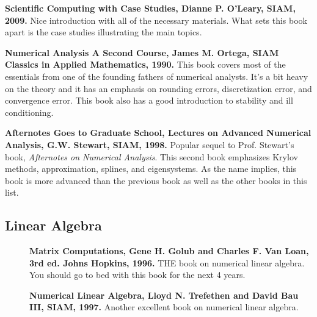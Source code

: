 \documentclass[11pt]{article}
\begin{document}
\begin{description}

\item {\bf Scientific Computing with Case Studies, Dianne P. O'Leary, SIAM, 2009.}  Nice introduction with all of the necessary materials.  What sets this book apart is the case studies illustrating the main topics.

\item {\bf Numerical Analysis A Second Course, James M. Ortega, SIAM Classics in Applied Mathematics, 1990.} This book covers most of the essentials from one of the founding fathers of numerical analysts.  It's a bit heavy on the theory and it has an emphasis on rounding errors, discretization error, and convergence error.  This book also has a good introduction to stability and ill conditioning.

 \item[] {\bf Afternotes Goes to Graduate School, Lectures on Advanced Numerical Analysis, G.W. Stewart, SIAM, 1998.}  Popular sequel to Prof. Stewart's book, {\it Afternotes on Numerical Analysis}.  This second book emphasizes Krylov methods, approximation, splines, and eigensystems. As the name implies, this book is more advanced than the previous book as well as the other books in this list. 

\end{description}

\subsection{Linear Algebra}
\begin{description}
\item[] {\bf Matrix Computations, Gene H. Golub and Charles F. Van Loan, 3rd ed. Johns Hopkins, 1996.}  THE book on numerical linear algebra.   You should go to bed with this book for the next 4 years.

\item[] {\bf Numerical Linear Algebra, Lloyd N. Trefethen and David Bau III, SIAM, 1997.} Another excellent book on numerical linear algebra. 
 
\end{description}
\end{document}
